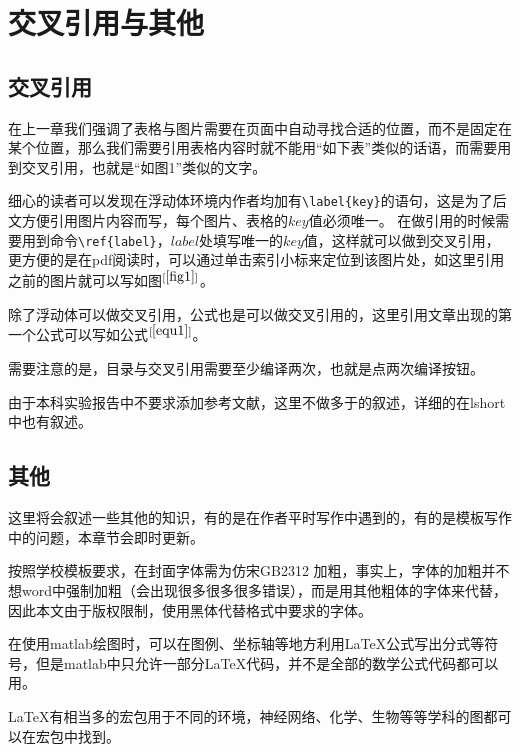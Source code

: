 \chapter{交叉引用与其他}
\section{交叉引用}
在上一章我们强调了表格与图片需要在页面中自动寻找合适的位置，而不是固定在某个位置，那么我们需要引用表格内容时就不能用“如下表”类似的话语，而需要用到交叉引用，也就是“如图1”类似的文字。

细心的读者可以发现在浮动体环境内作者均加有\verb|\label{key}|的语句，这是为了后文方便引用图片内容而写，每个图片、表格的$key$值必须唯一。
在做引用的时候需要用到命令\verb|\ref{label}|，$label$处填写唯一的$key$值，这样就可以做到交叉引用，更方便的是在pdf阅读时，可以通过单击索引小标来定位到该图片处，如这里引用之前的图片就可以写如图$^{[\ref{fig1}]}$。

除了浮动体可以做交叉引用，公式也是可以做交叉引用的，这里引用文章出现的第一个公式可以写如公式$^{[\ref{equ1}]}$。

需要注意的是，目录与交叉引用需要至少编译两次，也就是点两次编译按钮。

由于本科实验报告中不要求添加参考文献，这里不做多于的叙述，详细的在lshort中也有叙述。
\section{其他}
这里将会叙述一些其他的知识，有的是在作者平时写作中遇到的，有的是模板写作中的问题，本章节会即时更新。

按照学校模板要求，在封面字体需为仿宋GB2312 加粗，事实上，字体的加粗并不想word中强制加粗（会出现很多很多很多错误），而是用其他粗体的字体来代替，因此本文由于版权限制，使用黑体代替格式中要求的字体。

在使用matlab绘图时，可以在图例、坐标轴等地方利用\LaTeX 公式写出分式等符号，但是matlab中只允许一部分\LaTeX 代码，并不是全部的数学公式代码都可以用。

\LaTeX 有相当多的宏包用于不同的环境，神经网络、化学、生物等等学科的图都可以在宏包中找到。